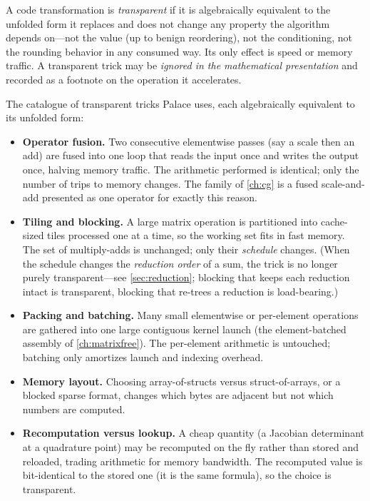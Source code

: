 \begin{definition}
\label{def:transparent}
A code transformation is \emph{transparent} if it is algebraically equivalent to
the unfolded form it replaces and does not change any property the algorithm
depends on---not the value (up to benign reordering), not the conditioning, not the
rounding behavior in any consumed way. Its only effect is speed or memory traffic.
A transparent trick may be \emph{ignored in the mathematical presentation} and
recorded as a footnote on the operation it accelerates.
\end{definition}

The catalogue of transparent tricks Palace uses, each algebraically equivalent to
its unfolded form:

\begin{itemize}[leftmargin=1.4em]
\item \textbf{Operator fusion.} Two consecutive elementwise passes (say a scale
  then an add) are fused into one loop that reads the input once and writes the
  output once, halving memory traffic. The arithmetic performed is identical; only
  the number of trips to memory changes. The  family of \cref{ch:cg} is
  a fused scale-and-add presented as one operator for exactly this reason.

\item \textbf{Tiling and blocking.} A large matrix operation is partitioned into
  cache-sized tiles processed one at a time, so the working set fits in fast memory.
  The set of multiply-adds is unchanged; only their \emph{schedule} changes. (When
  the schedule changes the \emph{reduction order} of a sum, the trick is no longer
  purely transparent---see \cref{sec:reduction}; blocking that keeps each reduction
  intact is transparent, blocking that re-trees a reduction is load-bearing.)

\item \textbf{Packing and batching.} Many small elementwise or per-element
  operations are gathered into one large contiguous kernel launch (the
  element-batched assembly of \cref{ch:matrixfree}). The per-element arithmetic is
  untouched; batching only amortizes launch and indexing overhead.

\item \textbf{Memory layout.} Choosing array-of-structs versus struct-of-arrays,
  or a blocked sparse format, changes which bytes are adjacent but not which
  numbers are computed.

\item \textbf{Recomputation versus lookup.} A cheap quantity (a Jacobian
  determinant at a quadrature point) may be recomputed on the fly rather than
  stored and reloaded, trading arithmetic for memory bandwidth. The recomputed
  value is bit-identical to the stored one (it is the same formula), so the choice
  is transparent.


\end{itemize}
